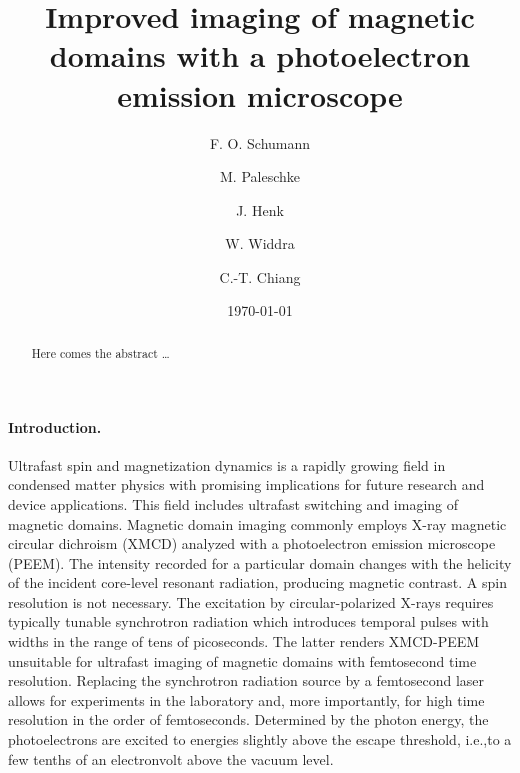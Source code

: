 \documentclass[prl,twocolumn,floatfix]{revtex4-2}
\begin{document}
\title{Improved imaging of magnetic domains with a photoelectron emission microscope}

\author{F. O. Schumann}

\author{M. Paleschke}
\author{J. Henk}
\author{W. Widdra}

\author{C.-T. Chiang}

\date{\today}

\begin{abstract}
Here comes the abstract \ldots
\end{abstract}

\pacs{}

\maketitle

\paragraph{Introduction.} Ultrafast spin and magnetization dynamics is a rapidly growing field in condensed matter physics with promising implications for future research and device applications.  This field includes ultrafast switching and imaging of magnetic domains. Magnetic domain imaging commonly employs X-ray magnetic circular dichroism (XMCD) analyzed with a photoelectron emission microscope (PEEM). The intensity recorded for a particular domain changes with the helicity of the incident core-level resonant radiation, producing magnetic contrast. A spin resolution is not necessary.  The excitation by circular-polarized X-rays requires typically tunable synchrotron radiation which introduces temporal pulses with widths in the range of tens of picoseconds. The latter renders XMCD-PEEM unsuitable for ultrafast imaging of magnetic domains with femtosecond time resolution. Replacing the synchrotron radiation source by a femtosecond laser allows for experiments in the laboratory and, more importantly, for high time resolution in the order of femtoseconds. Determined by the photon energy, the photoelectrons are excited to energies slightly above the escape threshold, i.e.,to a few tenths of an electronvolt above the vacuum level.  
\end{document}
